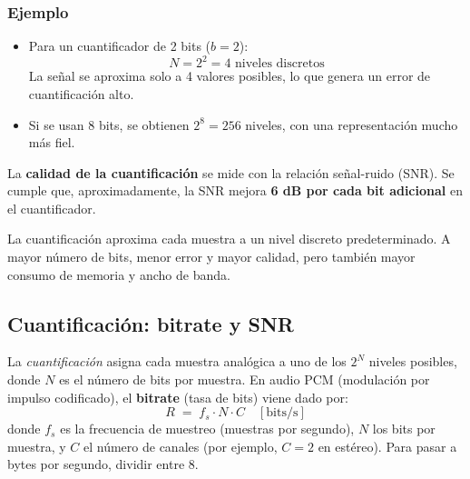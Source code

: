 \documentclass[11pt,a4paper]{article}
\begin{document}
\subsubsection*{Ejemplo}
\begin{itemize}
  \item Para un cuantificador de 2 bits ($b=2$):
  \begin{equation*}
  N = 2^2 = 4 \text{ niveles discretos}
  \end{equation*}
  La señal se aproxima solo a 4 valores posibles, lo que genera un error de cuantificación alto.
  \item Si se usan 8 bits, se obtienen $2^8 = 256$ niveles, con una representación mucho más fiel.
\end{itemize}

\begin{NotaBox}
La \textbf{calidad de la cuantificación} se mide con la relación señal-ruido (SNR).
Se cumple que, aproximadamente, la SNR mejora \textbf{6 dB por cada bit adicional} en el cuantificador.
\end{NotaBox}

\begin{ResumenBox}
La cuantificación aproxima cada muestra a un nivel discreto predeterminado.
A mayor número de bits, menor error y mayor calidad, pero también mayor consumo de memoria y ancho de banda.
\end{ResumenBox}

\subsection{Cuantificación: bitrate y SNR}

La \emph{cuantificación} asigna cada muestra analógica a uno de los $2^N$ niveles
posibles, donde $N$ es el número de bits por muestra. En audio PCM (modulación por
impulso codificado), el \textbf{bitrate} (tasa de bits) viene dado por:
\begin{equation}
  R \;=\; f_s \cdot N \cdot C \quad [\text{bits/s}]
\end{equation}
donde $f_s$ es la frecuencia de muestreo (muestras por segundo),
$N$ los bits por muestra, y $C$ el número de canales (por ejemplo, $C=2$ en estéreo).
Para pasar a bytes por segundo, dividir entre 8.
\end{document}
